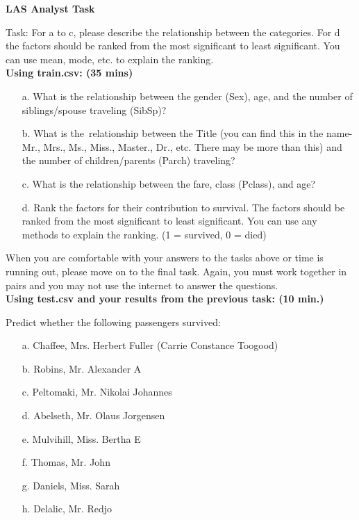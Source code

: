 \noindent
\textbf{LAS Analyst Task}

\noindent
Task: For a to c, please describe the relationship between the categories. For d the factors should be ranked from the most significant to least significant. You can use mean, mode, etc. to explain the ranking. \\

\noindent
\textbf{Using train.csv: (35 mins)}
\begin{itemize}
    \item[a.] What is the relationship between the gender (Sex), age, and the number of siblings/spouse traveling (SibSp)? 
    \item[b.] What is the relationship between the Title (you can find this in the name- Mr., Mrs., Ms., Miss., Master., Dr.,  etc. There may be more than this) and the number of children/parents (Parch) traveling?
    \item[c.] What is the relationship between the fare, class (Pclass), and age? 
    \item[d.] Rank the factors for their contribution to survival. The factors should be ranked from the most significant to least significant. You can use any methods to explain the ranking. (1 = survived, 0 = died)
\end{itemize}
   

When you are comfortable with your answers to the tasks above or time is running out, please move on to the final task. Again, you must work together in pairs and you may not use the internet to answer the questions. \\

\noindent
\textbf{Using test.csv and your results from the previous task: (10 min.)}

Predict whether the following passengers survived:

\begin{itemize}
    \item[a.] Chaffee, Mrs. Herbert Fuller (Carrie Constance Toogood)
    \item[b.] Robins, Mr. Alexander A
    \item[c.] Peltomaki, Mr. Nikolai Johannes 
    \item[d.] Abelseth, Mr. Olaus Jorgensen
    \item[e.] Mulvihill, Miss. Bertha E
    \item[f.] Thomas, Mr. John
    \item[g.] Daniels, Miss. Sarah
    \item[h.] Delalic, Mr. Redjo
\end{itemize}


